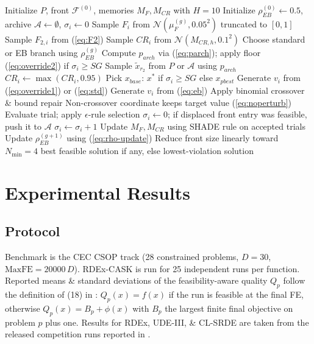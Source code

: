 \documentclass[conference]{IEEEtran}
\begin{document}
\begin{algorithm}[!ht]
\caption{RDEx-CASK}
\label{alg:rdex-cask}
\begin{algorithmic}[1]
\State Initialize $P$, front $\mathcal{F}^{(0)}$, memories $M_F, M_{CR}$ with $H = 10$
\State Initialize $\rho_{EB}^{(0)} \!\gets\! 0.5$, archive $\mathcal{A} \!\gets\! \emptyset$, $\sigma_i \!\gets\! 0$
        \State Sample $F_i$ from $\mathcal{N}(\mu_F^{(g)}, 0.05^2)$ truncated to $[0,1]$
        \State Sample $F_{2,i}$ from (\ref{eq:F2})
        \State Sample $CR_i$ from $\mathcal{N}(M_{CR,h}, 0.1^2)$
        \State Choose standard or EB branch using $\rho_{EB}^{(g)}$
            \State Compute $p_{arch}$ via (\ref{eq:parch}); apply floor (\ref{eq:override2}) if $\sigma_i \ge SG$
            \State Sample $\tilde{x}_{r_2}$ from $P$ or $\mathcal{A}$ using $p_{arch}$
                \State $CR_i \gets \max(CR_i, 0.95)$
            \EndIf
            \State Pick $x_{base}$: $x^{*}$ if $\sigma_i \ge SG$ else $x_{pbest}$
            \State Generate $v_i$ from (\ref{eq:override1}) or (\ref{eq:std})
        \Else
            \State Generate $v_i$ from (\ref{eq:eb})
        \EndIf
        \State Apply binomial crossover \& bound repair
        \State Non-crossover coordinate keeps target value (\ref{eq:noperturb})
        \State Evaluate trial; apply $\epsilon$-rule selection
            \State $\sigma_i \gets 0$; if displaced front entry was feasible, push it to $\mathcal{A}$
        \Else
            \State $\sigma_i \gets \sigma_i + 1$
        \EndIf
    \EndFor
    \State Update $M_F, M_{CR}$ using SHADE rule on accepted trials
    \State Update $\rho_{EB}^{(g+1)}$ using (\ref{eq:rho-update})
    \State Reduce front size linearly toward $N_{\min} = 4$
\EndWhile
\State \Return best feasible solution if any, else lowest-violation solution
\end{algorithmic}
\end{algorithm}

\section{Experimental Results}
\label{sec:exp}

\subsection{Protocol}
Benchmark is the CEC CSOP track (28 constrained problems, $D = 30$, $\text{MaxFE} = 20000\,D$). RDEx-CASK is run for 25 independent runs per function. Reported means \& standard deviations of the feasibility-aware quality $Q_p$ follow the definition of (18) in \cite{tao2026rdex}: $Q_p(x) = f(x)$ if the run is feasible at the final FE, otherwise $Q_p(x) = B_p + \phi(x)$ with $B_p$ the largest finite final objective on problem $p$ plus one. Results for RDEx, UDE-III, \& CL-SRDE are taken from the released competition runs reported in \cite{tao2026rdex}.
\end{document}

